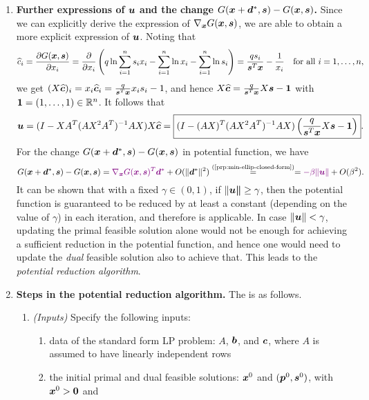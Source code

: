 \begin{enumerate}
\item \textbf{Further expressions of \(\bm{u}\) and the change
\(G(\bm{x}+\bm{d}^{*},\bm{s})-G(\bm{x},\bm{s})\).} Since we
can explicitly derive the expression of
\(\nabla_{\bm{x}}G(\bm{x},\bm{s})\), we are able to obtain a more
explicit expression of \(\bm{u}\). Noting that
\[
\widehat{c}_i=\pdv{G(\bm{x},\bm{s})}{x_i}
=\pdv{}{x_i}\left(q\ln\sum_{i=1}^{n}s_ix_i-\sum_{i=1}^{n}\ln x_i
-\sum_{i=1}^{n}\ln s_i\right)
=\frac{qs_i}{\bm{s}^{T}\bm{x}}-\frac{1}{x_i}
\quad\text{for all \(i=1,\dotsc,n\),}
\]
we get
\((X\widehat{\bm{c}})_{i}=x_i\widehat{\bm{c}}_i
=\frac{q}{\bm{s}^{T}\bm{x}}x_is_i-1\), and hence
\(X\widehat{\bm{c}}=\frac{q}{\bm{s}^{T}\bm{x}}X\bm{s}-\bm{1}\)
with \(\bm{1}=(1,\dotsc,1)\in\mathbb{R}^{n}\). It follows that
\[
\bm{u}=(I-XA^{T}(AX^{2}A^{T})^{-1}AX)X\widehat{\bm{c}}
=\boxed{(I-(AX)^{T}(AX^{2}A^{T})^{-1}AX)
\left(\frac{q}{\bm{s}^{T}\bm{x}}X\bm{s}-\bm{1}\right)}.
\]
For the change \(G(\bm{x}+\bm{d}^{*},\bm{s})-G(\bm{x},\bm{s})\) in
potential function, we have
\[
G(\vect{x}+\vect{d}^{*},\vect{s})-G(\vect{x},\vect{s})
=\vc{\nabla_{\vect{x}}G(\vect{x},\vect{s})^{T}\vect{d}^{*}}
+O(\|\vect{d}^{*}\|^{2})
\overset{\text{(\Cref{prp:min-ellip-closed-form})}}{=}
=\vc{-\beta\|\vect{u}\|}+O(\beta^{2}).
\]
It can be shown that with a fixed \(\gamma\in (0,1)\), if \(\|\bm{u\|}\ge
\gamma\), then the potential function is guaranteed to be reduced by at least a
constant (depending on the value of \(\gamma\)) in each iteration, and
therefore  is applicable. In case
\(\|\bm{u}\|<\gamma\), updating the primal feasible solution alone would not
be enough for achieving a sufficient reduction in the potential function, and
hence one would need to update the \emph{dual} feasible solution also to
achieve that. This leads to the \emph{potential reduction algorithm}.
\item \textbf{Steps in the potential reduction algorithm.} The  is as follows.
\begin{enumerate}[label={(\arabic*)}]
\item \emph{(Inputs)} Specify the following inputs:
\begin{enumerate}
\item data of the standard form LP problem: \(A\), \(\bm{b}\), and
\(\bm{c}\), where \(A\) is assumed to have linearly independent rows
\item the initial primal and dual feasible solutions: \(\bm{x}^{0}\) and
\((\bm{p}^{0},\bm{s}^{0})\), with \(\bm{x}^{0}>\bm{0}\) and

\end{enumerate}
\end{enumerate}
\end{enumerate}
